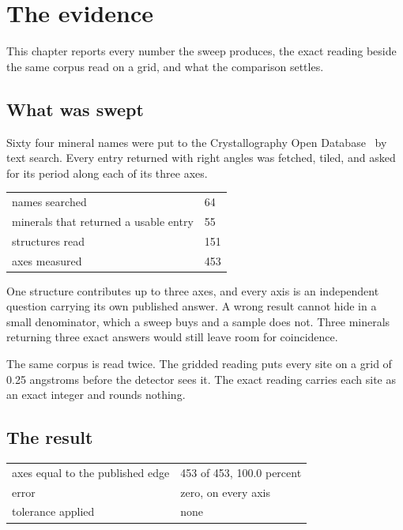 \chapter{The evidence}

This chapter reports every number the sweep produces, the exact reading beside the same corpus read on a grid, and what the comparison settles.

\section{What was swept}

Sixty four mineral names were put to the Crystallography Open Database~\cite{src:Crystallography-Open-Database} by text search. Every entry returned with right angles was fetched, tiled, and asked for its period along each of its three axes.

\begin{longtable}{@{}p{}p{}@{}}
\toprule
\endhead
names searched & 64 \\
minerals that returned a usable entry & 55 \\
structures read & 151 \\
axes measured & 453 \\
\bottomrule
\end{longtable}

One structure contributes up to three axes, and every axis is an independent question carrying its own published answer. A wrong result cannot hide in a small denominator, which a sweep buys and a sample does not. Three minerals returning three exact answers would still leave room for coincidence.

The same corpus is read twice. The gridded reading puts every site on a grid of 0.25 angstroms before the detector sees it. The exact reading carries each site as an exact integer and rounds nothing.

\section{The result}

\begin{longtable}{@{}p{}p{}@{}}
\toprule
\endhead
axes equal to the published edge & 453 of 453, 100.0 percent \\
error & zero, on every axis \\
tolerance applied & none \\
\bottomrule
\end{longtable}

